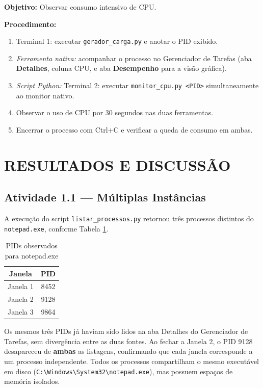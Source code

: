 \documentclass[12pt,a4paper]{article}
\begin{document}
\textbf{Objetivo:} Observar consumo intensivo de CPU.

\textbf{Procedimento:}
\begin{enumerate}
    \item Terminal 1: executar \texttt{gerador\_carga.py} e anotar o PID exibido.
    \item \textit{Ferramenta nativa:} acompanhar o processo no Gerenciador de Tarefas (aba \textbf{Detalhes}, coluna CPU, e aba \textbf{Desempenho} para a visão gráfica).
    \item \textit{Script Python:} Terminal 2: executar \texttt{monitor\_cpu.py <PID>} simultaneamente ao monitor nativo.
    \item Observar o uso de CPU por 30 segundos nas duas ferramentas.
    \item Encerrar o processo com Ctrl+C e verificar a queda de consumo em ambas.
\end{enumerate}

\section{RESULTADOS E DISCUSSÃO}

\subsection{Atividade 1.1 — Múltiplas Instâncias}

A execução do script \texttt{listar\_processos.py} retornou três processos distintos do \texttt{notepad.exe}, conforme Tabela \ref{tab:pids}.

\begin{table}[H]
\centering
\caption{PIDs observados para notepad.exe}
\label{tab:pids}
\begin{tabular}{@{}cc@{}}
\toprule
\textbf{Janela} & \textbf{PID} \\ \midrule
Janela 1 & 8452 \\
Janela 2 & 9128 \\
Janela 3 & 9864 \\ \bottomrule
\end{tabular}
\end{table}

Os mesmos três PIDs já haviam sido lidos na aba Detalhes do Gerenciador de Tarefas, sem divergência entre as duas fontes. Ao fechar a Janela 2, o PID 9128 desapareceu de \textbf{ambas} as listagens, confirmando que cada janela corresponde a um processo independente. Todos os processos compartilham o mesmo executável em disco (\texttt{C:\textbackslash Windows\textbackslash System32\textbackslash notepad.exe}), mas possuem espaços de memória isolados.
\end{document}
